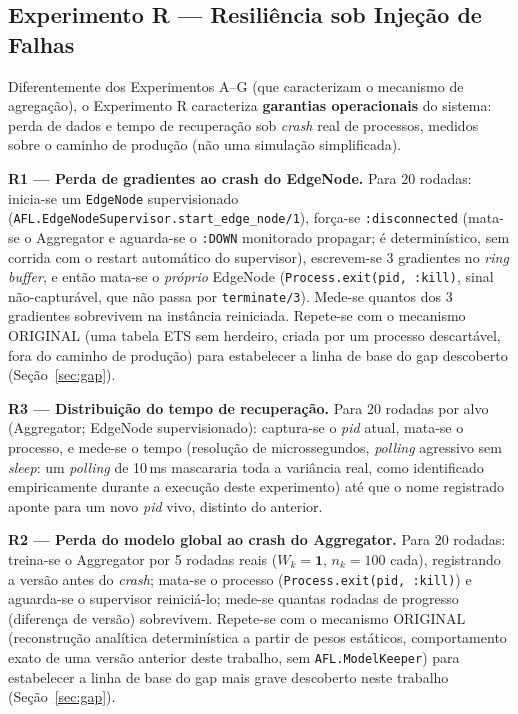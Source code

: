\documentclass[conference,a4paper]{IEEEtran}
\begin{document}
\subsection{Experimento R --- Resiliência sob Injeção de Falhas}
\label{sec:exp_h}

Diferentemente dos Experimentos A--G (que caracterizam o mecanismo de
agregação), o Experimento R caracteriza \textbf{garantias operacionais} do
sistema: perda de dados e tempo de recuperação sob \textit{crash} real de
processos, medidos sobre o caminho de produção (não uma simulação
simplificada).

\textbf{R1 --- Perda de gradientes ao crash do EdgeNode.} Para 20 rodadas:
inicia-se um \texttt{EdgeNode} supervisionado
(\texttt{AFL.EdgeNodeSupervisor.start\_edge\_node/1}), força-se
\texttt{:disconnected} (mata-se o Aggregator e aguarda-se o \texttt{:DOWN}
monitorado propagar; é determinístico, sem corrida com o restart
automático do supervisor), escrevem-se 3 gradientes no \textit{ring
buffer}, e então mata-se o \emph{próprio} EdgeNode
(\texttt{Process.exit(pid, :kill)}, sinal não-capturável, que não passa por
\texttt{terminate/3}). Mede-se quantos dos 3 gradientes sobrevivem na
instância reiniciada. Repete-se com o mecanismo ORIGINAL (uma tabela ETS
sem herdeiro, criada por um processo descartável, fora do caminho de
produção) para estabelecer a linha de base do gap descoberto
(Seção~\ref{sec:gap}).

\textbf{R3 --- Distribuição do tempo de recuperação.} Para 20 rodadas por
alvo (Aggregator; EdgeNode supervisionado): captura-se o \textit{pid}
atual, mata-se o processo, e mede-se o tempo (resolução de microssegundos,
\textit{polling} agressivo sem \textit{sleep}: um \textit{polling} de
10\,ms mascararia toda a variância real, como identificado empiricamente
durante a execução deste experimento) até que o nome registrado aponte
para um novo \textit{pid} vivo, distinto do anterior.

\textbf{R2 --- Perda do modelo global ao crash do Aggregator.} Para 20
rodadas: treina-se o Aggregator por 5 rodadas reais
($W_k=\mathbf{1}$, $n_k=100$ cada), registrando a versão antes do
\textit{crash}; mata-se o processo (\texttt{Process.exit(pid, :kill)}) e
aguarda-se o supervisor reiniciá-lo; mede-se quantas rodadas de progresso
(diferença de versão) sobrevivem. Repete-se com o mecanismo ORIGINAL
(reconstrução analítica determinística a partir de pesos estáticos,
comportamento exato de uma versão anterior deste trabalho, sem
\texttt{AFL.ModelKeeper}) para estabelecer a linha de base do gap mais
grave descoberto neste trabalho (Seção~\ref{sec:gap}).
\end{document}
